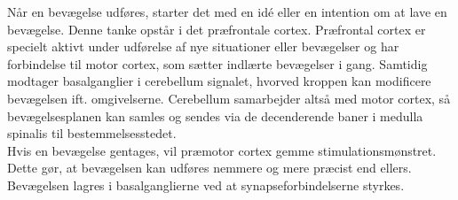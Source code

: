 Når en bevægelse udføres, starter det med en idé eller en intention om at lave en bevægelse. Denne tanke opstår i det præfrontale cortex. Præfrontal cortex er specielt aktivt under udførelse af nye situationer eller bevægelser og har forbindelse til motor cortex, som sætter indlærte bevægelser i gang. Samtidig modtager basalganglier i cerebellum signalet, hvorved kroppen kan modificere bevægelsen ift. omgivelserne. Cerebellum samarbejder altså med motor cortex, så bevægelsesplanen kan samles og sendes via de decenderende baner i medulla spinalis til bestemmelsesstedet. \cite{Bojsen-Moeller2012} \\
Hvis en bevægelse gentages, vil præmotor cortex gemme stimulationsmønstret. Dette gør, at bevægelsen kan udføres nemmere og mere præcist end ellers. Bevægelsen lagres i basalganglierne ved at synapseforbindelserne styrkes. \cite{Martini2012} 

